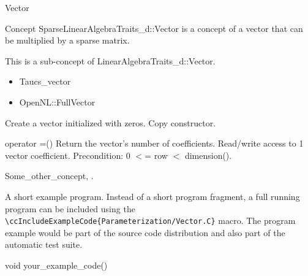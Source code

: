 

\begin{ccRefConcept}[SparseLinearAlgebra_d::]{Vector}


\ccDefinition

Concept SparseLinearAlgebraTraits\_d::Vector is a concept of a vector that can be multiplied by a sparse matrix.


\ccRefines

This is a sub-concept of LinearAlgebraTraits\_d::Vector.


\ccHasModels

\begin{itemize}
\item Taucs\_vector\item OpenNL::FullVector \end{itemize}






\ccTypes


{
}


\ccCreation
{}  %

{
Create a vector initialized with zeros.
}
{
Copy constructor.
}


\ccOperations

{
operator =()
}
{
Return the vector's number of coefficients.
}
{
Read/write access to 1 vector coefficient.
Precondition: 0 $<$= row $<$ dimension().
}
{
}


\ccSeeAlso

Some\_other\_concept,
.

\ccExample

A short example program.
Instead of a short program fragment, a full running program can be
included using the
\verb|\ccIncludeExampleCode{Parameterization/Vector.C}|
macro. The program example would be part of the source code distribution and
also part of the automatic test suite.

\begin{ccExampleCode}
void your_example_code() {
}
\end{ccExampleCode}


\end{ccRefConcept}


